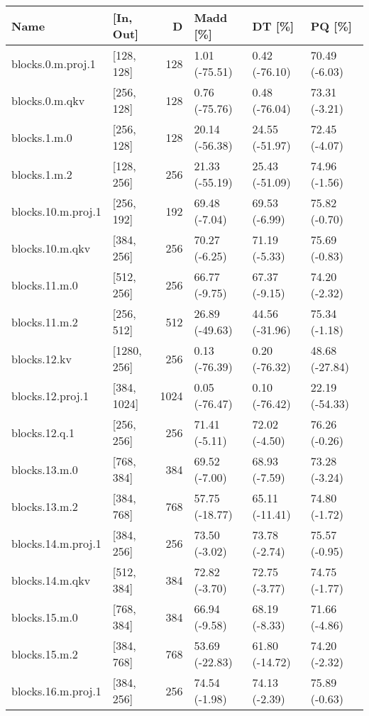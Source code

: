 \begin{tabular}{llrlll}
\toprule
              Name &   [In, Out] &    D &       Madd [\%] &         DT [\%] &         PQ [\%] \\
\midrule
 blocks.0.m.proj.1 &  [128, 128] &  128 &  1.01 (-75.51) &  0.42 (-76.10) &  70.49 (-6.03) \\
    blocks.0.m.qkv &  [256, 128] &  128 &  0.76 (-75.76) &  0.48 (-76.04) &  73.31 (-3.21) \\
      blocks.1.m.0 &  [256, 128] &  128 & 20.14 (-56.38) & 24.55 (-51.97) &  72.45 (-4.07) \\
      blocks.1.m.2 &  [128, 256] &  256 & 21.33 (-55.19) & 25.43 (-51.09) &  74.96 (-1.56) \\
blocks.10.m.proj.1 &  [256, 192] &  192 &  69.48 (-7.04) &  69.53 (-6.99) &  75.82 (-0.70) \\
   blocks.10.m.qkv &  [384, 256] &  256 &  70.27 (-6.25) &  71.19 (-5.33) &  75.69 (-0.83) \\
     blocks.11.m.0 &  [512, 256] &  256 &  66.77 (-9.75) &  67.37 (-9.15) &  74.20 (-2.32) \\
     blocks.11.m.2 &  [256, 512] &  512 & 26.89 (-49.63) & 44.56 (-31.96) &  75.34 (-1.18) \\
      blocks.12.kv & [1280, 256] &  256 &  0.13 (-76.39) &  0.20 (-76.32) & 48.68 (-27.84) \\
  blocks.12.proj.1 & [384, 1024] & 1024 &  0.05 (-76.47) &  0.10 (-76.42) & 22.19 (-54.33) \\
     blocks.12.q.1 &  [256, 256] &  256 &  71.41 (-5.11) &  72.02 (-4.50) &  76.26 (-0.26) \\
     blocks.13.m.0 &  [768, 384] &  384 &  69.52 (-7.00) &  68.93 (-7.59) &  73.28 (-3.24) \\
     blocks.13.m.2 &  [384, 768] &  768 & 57.75 (-18.77) & 65.11 (-11.41) &  74.80 (-1.72) \\
blocks.14.m.proj.1 &  [384, 256] &  256 &  73.50 (-3.02) &  73.78 (-2.74) &  75.57 (-0.95) \\
   blocks.14.m.qkv &  [512, 384] &  384 &  72.82 (-3.70) &  72.75 (-3.77) &  74.75 (-1.77) \\
     blocks.15.m.0 &  [768, 384] &  384 &  66.94 (-9.58) &  68.19 (-8.33) &  71.66 (-4.86) \\
     blocks.15.m.2 &  [384, 768] &  768 & 53.69 (-22.83) & 61.80 (-14.72) &  74.20 (-2.32) \\
blocks.16.m.proj.1 &  [384, 256] &  256 &  74.54 (-1.98) &  74.13 (-2.39) &  75.89 (-0.63) \\

\end{tabular}

